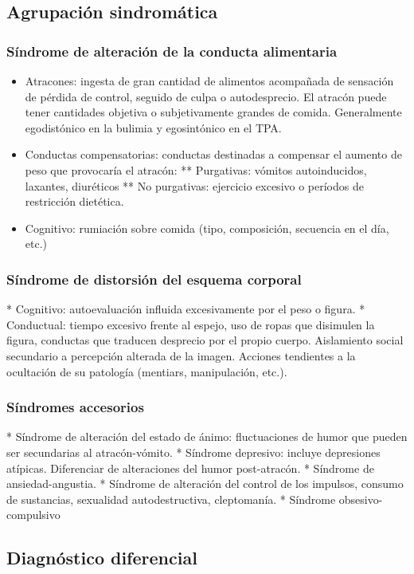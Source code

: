 \documentclass{scrbook}
\begin{document}
\subsection*{Agrupación sindromática}
\subsubsection*{Síndrome de alteración de la conducta alimentaria}
\begin{itemize}
	\item Atracones: ingesta de gran cantidad de alimentos acompañada de sensación de pérdida de control, seguido de culpa o autodesprecio. El atracón puede tener cantidades objetiva o subjetivamente grandes de comida. Generalmente egodistónico en la bulimia y egosintónico en el TPA.
	\item Conductas compensatorias: conductas destinadas a compensar el aumento de peso que provocaría el atracón:
** Purgativas: vómitos autoinducidos, laxantes, diuréticos
** No purgativas: ejercicio excesivo o períodos de restricción dietética.
	\item Cognitivo: rumiación sobre comida (tipo, composición, secuencia en el día, etc.)
\end{itemize}

\subsubsection*{Síndrome de distorsión del esquema corporal}
* Cognitivo: autoevaluación influida excesivamente por el peso o figura.
* Conductual: tiempo excesivo frente al espejo, uso de ropas que disimulen la figura, conductas que traducen desprecio por el propio cuerpo. Aislamiento social secundario a percepción alterada de la imagen. Acciones tendientes a la ocultación de su patología (mentiars, manipulación, etc.).
\subsubsection*{Síndromes accesorios}
* Síndrome de alteración del estado de ánimo: fluctuaciones de humor que pueden ser secundarias al atracón-vómito.
* Síndrome depresivo: incluye depresiones atípicas. Diferenciar de alteraciones del humor post-atracón.
* Síndrome de ansiedad-angustia.
* Síndrome de alteración del control de los impulsos, consumo de sustancias, sexualidad autodestructiva, cleptomanía.
* Síndrome obsesivo-compulsivo
\subsection*{Diagnóstico diferencial}
\end{document}
